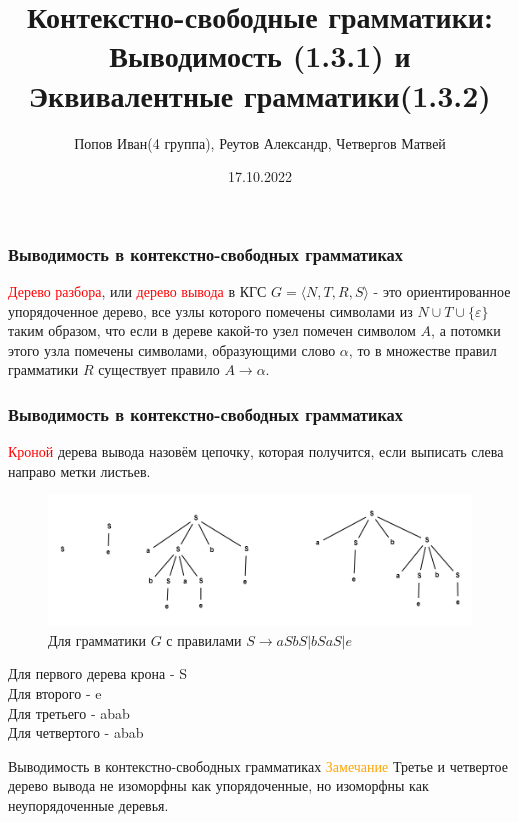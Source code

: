 \documentclass{beamer}
\title{Контекстно-свободные грамматики: Выводимость (1.3.1) и Эквивалентные грамматики(1.3.2)}
\author{Попов Иван(4 группа), Реутов Александр, Четвергов Матвей}
\date{17.10.2022}
\begin{document}
	\frame{\titlepage}
	\begin{frame}
    \frametitle{Выводимость в контекстно-свободных грамматиках}
        \textcolor{red}{Дерево разбора}, или \textcolor{red}{дерево вывода} в КГС $G=\langle N,T,R,S \rangle$ - это ориентированное упорядоченное дерево, все узлы которого помечены символами из $N \cup T \cup \{\varepsilon\}$ таким образом, что если в дереве какой-то узел помечен символом $A$, а потомки этого узла помечены символами, образующими слово $\alpha$, то в множестве правил грамматики $R$ существует правило $A \rightarrow \alpha$.
	\end{frame}
	
		\begin{frame}
    \frametitle{Выводимость в контекстно-свободных грамматиках}
        \textcolor{red}{Кроной} дерева вывода назовём цепочку, которая получится, если выписать слева направо метки листьев.\\
        
         \begin{figure}[!tbp]
          \centering
          \begin{minipage}[b]{1\textwidth}
            \includegraphics[width=\textwidth]{crown_ex.png}
          \end{minipage}
          \caption{Для грамматики $G$ с правилами $S \longrightarrow aSbS|bSaS|e$}
          \end{figure}
          Для первого дерева крона - S\\
          Для второго - e\\
          Для третьего - abab\\
          Для четвертого - abab
          
	\end{frame}
	
	\begin{frame}{Выводимость в контекстно-свободных грамматиках}
	\textcolor{orange}{Замечание} Третье и четвертое дерево вывода не изоморфны как упорядоченные, но изоморфны как неупорядоченные деревья. 
	
	    
	\end{frame}
	
\end{document}

